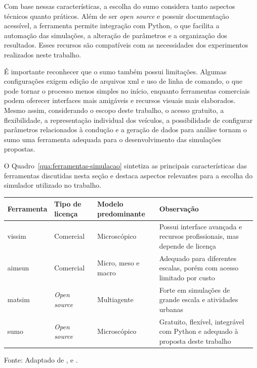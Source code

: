 Com base nessas características, a escolha do \gls{sumo} considera tanto aspectos técnicos quanto práticos. Além de ser \textit{open source} e possuir documentação acessível, a ferramenta permite integração com Python, o que facilita a automação das simulações, a alteração de parâmetros e a organização dos resultados. Esses recursos são compatíveis com as necessidades dos experimentos realizados neste trabalho.

É importante reconhecer que o \gls{sumo} também possui limitações. Algumas configurações exigem edição de arquivos \gls{xml} e uso de linha de comando, o que pode tornar o processo menos simples no início, enquanto ferramentas comerciais podem oferecer interfaces mais amigáveis e recursos visuais mais elaborados. Mesmo assim, considerando o escopo deste trabalho, o acesso gratuito, a flexibilidade, a representação individual dos veículos, a possibilidade de configurar parâmetros relacionados à condução e a geração de dados para análise tornam o \gls{sumo} uma ferramenta adequada para o desenvolvimento das simulações propostas.

O Quadro~\ref{qua:ferramentas-simulacao} sintetiza as principais características das ferramentas discutidas nesta seção e destaca aspectos relevantes para a escolha do simulador utilizado no trabalho.

\begin{quadro}[H]
\centering
\caption{Comparação simplificada entre ferramentas de simulação de tráfego}
\label{qua:ferramentas-simulacao}
\small
\begin{tabular}{|p{2cm} | p{2.5cm} | p{3.8cm} | p{5.8cm}|}
\hline
\textbf{Ferramenta} & \textbf{Tipo de licença} & \textbf{Modelo predominante} & \textbf{Observação} \\
\hline
\gls{vissim} & Comercial & Microscópico & Possui interface avançada e recursos profissionais, mas depende de licença \\
\hline
\gls{aimsun} & Comercial & Micro, meso e macro & Adequado para diferentes escalas, porém com acesso limitado por custo \\
\hline
\gls{matsim} & \textit{Open source} & Multiagente & Forte em simulações de grande escala e atividades urbanas \\
\hline
\gls{sumo} & \textit{Open source} & Microscópico & Gratuito, flexível, integrável com Python e adequado à proposta deste trabalho \\
\hline
\end{tabular}

\par\vspace{0.25cm}
\begin{minipage}{\textwidth}
\footnotesize Fonte: Adaptado de ,  e .
\end{minipage}

\end{quadro}

